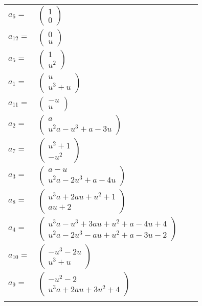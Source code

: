 \documentclass[1p]{elsarticle_modified}
\theoremstyle{definition}
\begin{document}
\begin{tabular}{m{7pt} m{180pt} m{7pt} m{180pt} }
\flushright $a_{6}=$&$\begin{pmatrix}1\\0\end{pmatrix}$ \\
\flushright $a_{12}=$&$\begin{pmatrix}0\\u\end{pmatrix}$ \\
\flushright $a_{5}=$&$\begin{pmatrix}1\\u^2\end{pmatrix}$ \\
\flushright $a_{1}=$&$\begin{pmatrix}u\\u^3+u\end{pmatrix}$ \\
\flushright $a_{11}=$&$\begin{pmatrix}- u\\u\end{pmatrix}$ \\
\flushright $a_{2}=$&$\begin{pmatrix}a\\u^2 a- u^3+a-3 u\end{pmatrix}$ \\
\flushright $a_{7}=$&$\begin{pmatrix}u^2+1\\- u^2\end{pmatrix}$ \\
\flushright $a_{3}=$&$\begin{pmatrix}a- u\\u^2 a-2 u^3+a-4 u\end{pmatrix}$ \\
\flushright $a_{8}=$&$\begin{pmatrix}u^3 a+2 a u+u^2+1\\a u+2\end{pmatrix}$ \\
\flushright $a_{4}=$&$\begin{pmatrix}u^3 a- u^3+3 a u+u^2+a-4 u+4\\u^2 a-2 u^3- a u+u^2+a-3 u-2\end{pmatrix}$ \\
\flushright $a_{10}=$&$\begin{pmatrix}- u^3-2 u\\u^3+u\end{pmatrix}$ \\
\flushright $a_{9}=$&$\begin{pmatrix}- u^2-2\\u^3 a+2 a u+3 u^2+4\end{pmatrix}$\\&\end{tabular}
\end{document}
